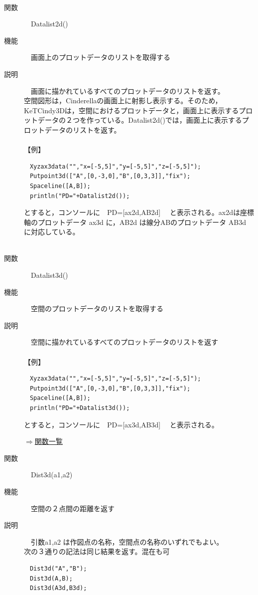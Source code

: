 \documentclass[papersize,a4paper,12pt,uplatex]{jsarticle}
\begin{document}
\begin{description}
\hypertarget{datalist}{}　　
\item[関数]　Datalist2d()
\item[機能]　画面上のプロットデータのリストを取得する
\item[説明]　画面に描かれているすべてのプロットデータのリストを返す。\\
空間図形は，Cinderellaの画面上に射影し表示する。そのため，KeTCindy3Dは，空間におけるプロットデータと，画面上に表示するプロットデータの２つを作っている。Datalist2d()では，画面上に表示するプロットデータのリストを返す。\\
　\\
【例】
\begin{verbatim}
　Xyzax3data("","x=[-5,5]","y=[-5,5]","z=[-5,5]");
　Putpoint3d(["A",[0,-3,0],"B",[0,3,3]],"fix");
　Spaceline([A,B]);
　println("PD="+Datalist2d());
\end{verbatim}
とすると，コンソールに　PD=[ax2d,AB2d] 　と表示される。ax2dは座標軸のプロットデータ ax3d に，AB2d は線分ABのプロットデータ AB3d に対応している。\\
　\\

\hypertarget{datalist}{}
\item[関数]　Datalist3d()
\item[機能]　空間のプロットデータのリストを取得する
\item[説明]　空間に描かれているすべてのプロットデータのリストを返す\\
　\\
【例】
\begin{verbatim}
　Xyzax3data("","x=[-5,5]","y=[-5,5]","z=[-5,5]");
　Putpoint3d(["A",[0,-3,0],"B",[0,3,3]],"fix");
　Spaceline([A,B]);
　println("PD="+Datalist3d());
\end{verbatim}
とすると，コンソールに　PD=[ax3d,AB3d] 　と表示される。\\

\begin{flushright} \hyperlink{functionlist3d}{$\Rightarrow$関数一覧}\end{flushright}

\hypertarget{dist3d}{}
\item[関数]　Dist3d(a1,a2)
\item[機能]　空間の２点間の距離を返す
\item[説明]　引数a1,a2 は作図点の名称，空間点の名称のいずれでもよい。\\
次の３通りの記法は同じ結果を返す。混在も可
\begin{verbatim}
　Dist3d("A","B");
　Dist3d(A,B);
　Dist3d(A3d,B3d);
\end{verbatim}
　\\


\end{description}
\end{document}
